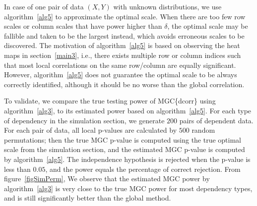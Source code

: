 \documentclass[11pt]{article}
\begin{document}
In case of one pair of data $(X,Y)$ with unknown distributions, we use algorithm~\ref{alg5} to approximate the optimal scale. When there are too few row scales or column scales that have power higher than $\delta$, the optimal scale may be fallible and taken to be the largest instead, which avoids erroneous scales to be discovered. The motivation of algorithm~\ref{alg5} is based on observing the heat maps in section~\ref{main3}, i.e., there exists multiple row or column indices such that most local correlations on the same row/column are equally significant. However, algorithm~\ref{alg5} does not guarantee the optimal scale to be always correctly identified, although it should be no worse than the global correlation.


To validate, we compare the true testing power of MGC\{dcorr\} using algorithm~\ref{alg3}, to its estimated power based on algorithm~\ref{alg5}. For each type of dependency in the simulation section, we generate $200$ pairs of dependent data. For each pair of data, all local p-values are calculated by $500$ random permutations; then the true MGC p-value is computed using the true optimal scale from the simulation section, and the estimated MGC p-value is computed by algorithm~\ref{alg5}. The independence hypothesis is rejected when the p-value is less than $0.05$, and the power equals the percentage of correct rejection. From figure~\ref{figSimPerm}, We observe that the estimated MGC power by algorithm~\ref{alg3} is very close to the true MGC power for most dependency types, and is still significantly better than the global method. 
\end{document}
